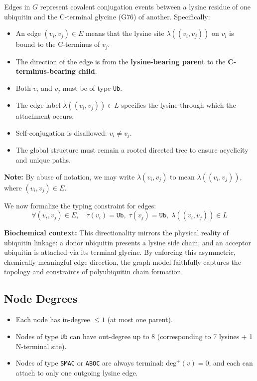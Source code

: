 \documentclass[12pt]{article}
\begin{document}
Edges in $G$ represent covalent conjugation events between a lysine residue of one ubiquitin and the C-terminal glycine (G76) of another. Specifically:

\begin{itemize}
    \item An edge $(v_i, v_j) \in E$ means that the lysine site $\lambda((v_i, v_j))$ on $v_i$ is bound to the C-terminus of $v_j$.
    \item The direction of the edge is from the \textbf{lysine-bearing parent} to the \textbf{C-terminus-bearing child}.
    \item Both $v_i$ and $v_j$ must be of type \texttt{Ub}.
    \item The edge label $\lambda((v_i, v_j)) \in L$ specifies the lysine through which the attachment occurs.
    \item Self-conjugation is disallowed: $v_i \ne v_j$.
    \item The global structure must remain a rooted directed tree to ensure acyclicity and unique paths.
\end{itemize}

\textbf{Note:} By abuse of notation, we may write $\lambda(v_i, v_j)$ to mean $\lambda((v_i, v_j))$, where $(v_i, v_j) \in E$.

We now formalize the typing constraint for edges:
\[
\forall (v_i, v_j) \in E,\quad \tau(v_i) = \texttt{Ub},\; \tau(v_j) = \texttt{Ub},\; \lambda((v_i, v_j)) \in L
\]

\textbf{Biochemical context:} This directionality mirrors the physical reality of ubiquitin linkage: a donor ubiquitin presents a lysine side chain, and an acceptor ubiquitin is attached via its terminal glycine. By enforcing this asymmetric, chemically meaningful edge direction, the graph model faithfully captures the topology and constraints of polyubiquitin chain formation.

\subsection*{Node Degrees}
\begin{itemize}
    \item Each node has in-degree $\leq 1$ (at most one parent).
    \item Nodes of type \texttt{Ub} can have out-degree up to 8 (corresponding to 7 lysines + 1 N-terminal site).
    \item Nodes of type \texttt{SMAC} or \texttt{ABOC} are always terminal: $\text{deg}^+(v) = 0$, and each can attach to only one outgoing lysine edge.
\end{itemize}
\end{document}
